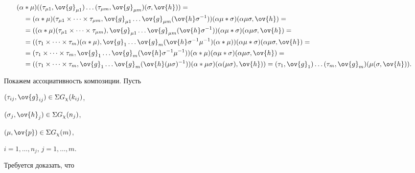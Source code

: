 \begin{pf}
\begin{align*}
%


&(\al * \mu)((\t_{\mu1},\ov{g}_{\mu1}) \dotsc


(\t_{\mu{m}},\ov{g}_{\mu{m}})(\s,\ov{h}))=\\


&\quad=(\al *\mu) (\t_{\mu1} \times \dotsb \times \t_{\mu m}, 


\ov{g}_{\mu1} \dotsc \ov{g}_{\mu m} (\ov{h} \s^{-1}))


(\al \mu * \s)(\al\mu\s,\ov{h})= \\


&\quad=((\al *\mu) (\t_{\mu1} \times \dotsb \times \t_{\mu m}), 


\ov{g}_{\mu1} \dotsc \ov{g}_{\mu m} (\ov{h} \s^{-1}) )


(\al \mu * \s)(\al\mu\s,\ov{h})= \\


&\quad=((\t_{1} \times \dotsb \times \t_{m})(\al *\mu), 


\ov{g}_{1} \dotsc \ov{g}_{m} (\ov{h} \s^{-1} \mu^{-1}) (\al * \mu) )


(\al \mu * \s)(\al\mu\s,\ov{h})= \\


&\quad=(\t_{1} \times \dotsb \times \t_{m}, 


\ov{g}_{1} \dotsc \ov{g}_{m} (\ov{h} \s^{-1} \mu^{-1}))


(\al * \mu) (\al \mu * \s)(\al\mu\s,\ov{h})=\\


&\quad=(( \t_1 \times \dotsb \times \t_{m}, 


\ov{g}_{1} \dotsc \ov{g}_{m} (\ov{h} (\mu\s)^{-1}) )


(\al * \mu\s)(\al(\mu\s),\ov{h}))=


(\t_1,\ov{g}_1) \dotsc (\t_m,\ov{g}_m)(\mu(\s,\ov{h})).


\end{align*}





Покажем ассоциативность композиции. Пусть


$(\t_{ij},\ov{g}_{ij}) \in \sym G_{\chi}({k_{ij}})$,


$(\s_{j},\ov{h}_{j}) \in \sym G_{\chi}({n_{j}})$,


$(\mu,\ov{p}) \in \sym G_{\chi}({m})$,


$i=1, \dotsc , n_{j}$, $j=1, \dotsc , m$.





Требуется доказать, что



\end{pf}
